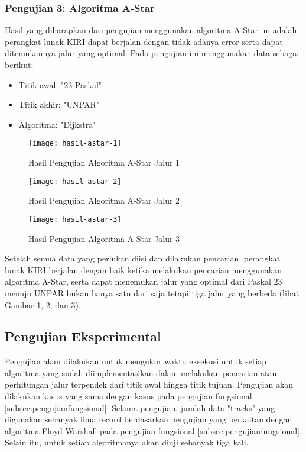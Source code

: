 \subsubsection{Pengujian 3: Algoritma A-Star}
Hasil yang diharapkan dari pengujian menggunakan algoritma A-Star ini adalah perangkat lunak KIRI dapat berjalan dengan tidak adanya error serta dapat ditemukannya jalur yang optimal. Pada pengujian ini menggunakan data sebagai berikut:
\begin{itemize}
    \item Titik awal: "23 Paskal"
    \item Titik akhir: "UNPAR"
    \item Algoritma: "Dijkstra"
\end{itemize}

\begin{figure}[H]
    \centering
    \texttt{[image: hasil-astar-1]}
    \caption{Hasil Pengujian Algoritma A-Star Jalur 1}
    \label{fig:hasilastar1}
\end{figure}

\begin{figure}[H]
    \centering
    \texttt{[image: hasil-astar-2]}
    \caption{Hasil Pengujian Algoritma A-Star Jalur 2}
    \label{fig:hasilastar2}
\end{figure}

\begin{figure}[H]
    \centering
    \texttt{[image: hasil-astar-3]}
    \caption{Hasil Pengujian Algoritma A-Star Jalur 3}
    \label{fig:hasilastar3}
\end{figure}

\noindent
Setelah semua data yang perlukan diisi dan dilakukan pencarian, perangkat lunak KIRI berjalan dengan baik ketika melakukan pencarian menggunakan algoritma A-Star, serta dapat menemukan jalur yang optimal dari Paskal 23 menuju UNPAR bukan hanya satu dari saja tetapi tiga jalur yang berbeda (lihat Gambar \ref{fig:hasilastar1}, \ref{fig:hasilastar2}, dan \ref{fig:hasilastar3}).

\subsection{Pengujian Eksperimental}
\label{subsec:pengujianeksperimental}
Pengujian akan dilakukan untuk mengukur waktu eksekusi untuk setiap algoritma yang sudah diimplementasikan dalam melakukan pencarian atau perhitungan jalur terpendek dari titik awal hingga titik tujuan. Pengujian akan dilakukan kasus yang sama dengan kasus pada pengujian fungsional \ref{subsec:pengujianfungsional}. Selama pengujian, jumlah data "tracks" yang digunakan sebanyak lima record berdasarkan pengujian yang berkaitan dengan algoritma Floyd-Warshall pada pengujian fungsional \ref{subsec:pengujianfungsional}. Selain itu, untuk setiap algoritmanya akan diuji sebanyak tiga kali.

